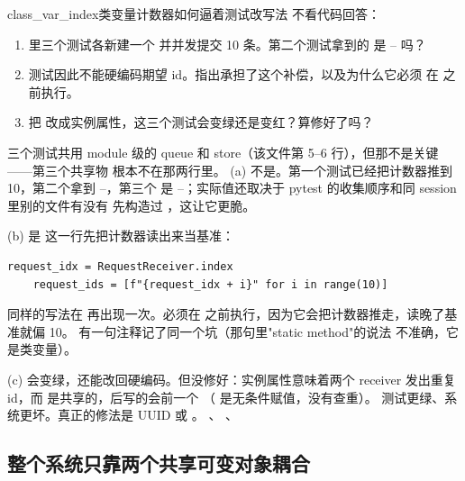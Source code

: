 \begin{checkpoint}{class_var_index}{类变量计数器如何逼着测试改写法}
不看代码回答：
\begin{enumerate}[label=(\alph*)]
  \item {} 里三个测试各新建一个 
        并并发提交 10 条。第二个测试拿到的  是 -- 吗？
  \item 测试因此不能硬编码期望 id。指出承担了这个补偿，以及为什么它必须
        在  之前执行。
  \item 把  改成实例属性，这三个测试会变绿还是变红？算修好了吗？
\end{enumerate}
\hint 三个测试共用 module 级的 queue 和 store（该文件第 5--6 行），但那不是关键——第三个共享物
根本不在那两行里。
\ifshowanswers
\tcblower
\answer (a) 不是。第一个测试已经把计数器推到 10，第二个拿到 --，第三个
是 --；实际值还取决于 pytest 的收集顺序和同 session 里别的文件有没有
先构造过 ，这让它更脆。

(b) 是  这一行先把计数器读出来当基准：

\begin{lstlisting}[style=hlnum, firstnumber=16]
    request_idx = RequestReceiver.index
    request_ids = [f"{request_idx + i}" for i in range(10)]
\end{lstlisting}

同样的写法在  再出现一次。必须在
 之前执行，因为它会把计数器推走，读晚了基准就偏 10。
 有一句注释记了同一个坑（那句里"static method"的说法
不准确，它是类变量）。

(c) 会变绿，还能改回硬编码。但没修好：实例属性意味着两个 receiver 发出重复 id，而
 是共享的，后写的会前一个
（ 是无条件赋值，没有查重）。
测试更绿、系统更坏。真正的修法是 UUID 或 。
\whereincode {}、
、
\fi
\end{checkpoint}

\subsection{整个系统只靠两个共享可变对象耦合}
\label{sec:a-shape-shared}

